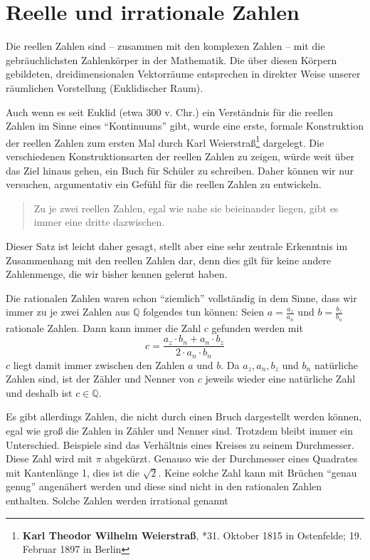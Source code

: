\section{Reelle und irrationale Zahlen}\label{chap:realbegin}

Die reellen Zahlen sind -- zusammen mit den komplexen Zahlen -- mit die gebräuchlichsten Zahlenkörper in der Mathematik. Die über diesen Körpern gebildeten, dreidimensionalen Vektorräume entsprechen in direkter Weise unserer räumlichen Vorstellung (Euklidischer Raum). 

Auch wenn es seit Euklid (etwa 300 v. Chr.) ein Verständnis für die reellen Zahlen im Sinne eines "`Kontinuums"' gibt, wurde eine erste, formale Konstruktion der reellen Zahlen zum ersten Mal durch Karl Weierstraß\footnote{\textbf{Karl Theodor Wilhelm Weierstraß}, *31. Oktober 1815 in Ostenfelde; 19. Februar 1897 in Berlin} dargelegt. Die verschiedenen Konstruktionsarten der reellen Zahlen zu zeigen, würde weit über das Ziel hinaus gehen, ein Buch für Schüler zu schreiben. Daher können wir nur versuchen, argumentativ ein Gefühl für die reellen Zahlen zu entwickeln. 
\begin{quote}
Zu je zwei reellen Zahlen, egal wie nahe sie beieinander liegen, gibt es immer eine dritte dazwischen.
\end{quote}
Dieser Satz ist leicht daher gesagt, stellt aber eine sehr zentrale Erkenntnis im Zusammenhang mit den reellen Zahlen dar, denn dies gilt für keine andere Zahlenmenge, die wir bisher kennen gelernt haben.

Die rationalen Zahlen waren schon "`ziemlich"' vollständig in dem Sinne, dass wir immer zu je zwei Zahlen aus $\mathbb{Q}$ folgendes tun können: Seien $a=\frac{a_z}{a_n}$ und $b=\frac{b_z}{b_n}$ rationale Zahlen. Dann kann immer die Zahl $c$ gefunden werden mit
\[
c = \frac{a_z\cdot b_n + a_n\cdot b_z}{2\cdot a_n\cdot b_n}
\]
$c$ liegt damit immer zwischen den Zahlen $a$ und $b$. Da $a_z,a_n,b_z$ und $b_n$ natürliche Zahlen sind, ist der Zähler und Nenner von $c$ jeweils wieder eine natürliche Zahl und deshalb ist $c\in \mathbb{Q}$. 

Es gibt allerdings Zahlen, die nicht durch einen Bruch dargestellt werden können, egal wie groß die Zahlen in Zähler und Nenner sind. Trotzdem bleibt immer ein Unterschied. Beispiele sind das Verhältnis eines Kreises zu seinem Durchmesser. Diese Zahl wird mit $\pi$ abgekürzt. Genauso wie der Durchmesser eines Quadrates mit Kantenlänge 1, dies ist die $\sqrt{2}$. Keine solche Zahl kann mit Brüchen "`genau genug"' angenähert werden und diese sind nicht in den rationalen Zahlen enthalten. Solche Zahlen werden irrational genannt

